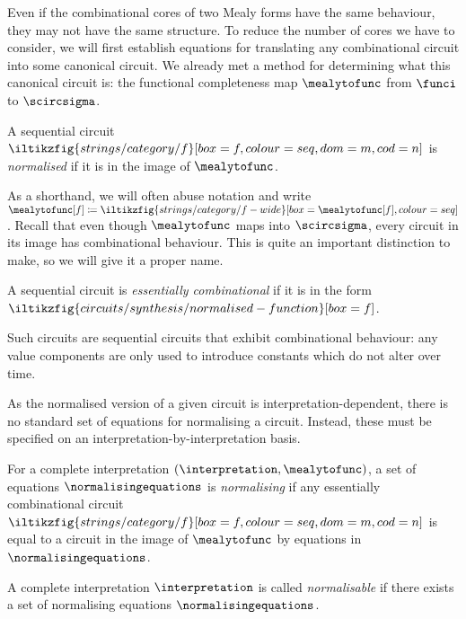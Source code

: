 \documentclass{lmcs}
\begin{document}
Even if the combinational cores of two Mealy forms have the same behaviour, they
may not have the same structure.
To reduce the number of cores we have to consider, we will first establish
equations for translating any combinational circuit into some canonical circuit.
We already met a method for determining what this canonical circuit is: the
functional completeness map \(\mealytofunc\) from \(\funci\) to \(\scircsigma\).

\begin{defi}
    A sequential circuit \(
    \iltikzfig{strings/category/f}[box=f,colour=seq,dom=m,cod=n]
    \) is \emph{normalised} if it is in the image of \(\mealytofunc\).
\end{defi}

As a shorthand, we will often abuse notation and write \(
\mealytofunc[f]
\coloneqq
\iltikzfig{strings/category/f-wide}[box=\mealytofunc[f],colour=seq]
\).
Recall that even though \(\mealytofunc\) maps into \(\scircsigma\), every
circuit in its image has combinational behaviour.
This is quite an important distinction to make, so we will give it a proper
name.

\begin{defi}
    A sequential circuit is \emph{essentially combinational} if it is in the
    form \(
    \iltikzfig{circuits/synthesis/normalised-function}[box=f]
    \).
\end{defi}

Such circuits are sequential circuits that exhibit combinational behaviour: any
value components are only used to introduce constants which do not alter over
time.

As the normalised version of a given circuit is interpretation-dependent, there
is no standard set of equations for normalising a circuit.
Instead, these must be specified on an interpretation-by-interpretation basis.

\begin{defi}
    For a complete interpretation \((\interpretation,\mealytofunc)\), a set of
    equations \(\normalisingequations\) is \emph{normalising} if any
    essentially combinational circuit \(
    \iltikzfig{strings/category/f}[box=f,colour=seq,dom=m,cod=n]
    \) is equal to a circuit in the image of \(\mealytofunc\) by equations in
    \(\normalisingequations\).
\end{defi}

\begin{defi}
    A complete interpretation \(\interpretation\) is called \emph{normalisable} if there
    exists a set of normalising equations \(\normalisingequations\).
\end{defi}
\end{document}
